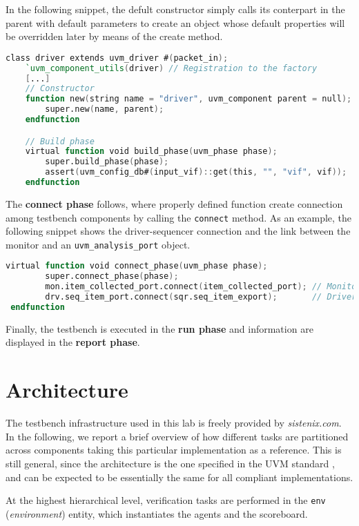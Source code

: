 In the following snippet, the defult constructor simply calls its conterpart in the parent with default parameters to create an object whose default properties will be overridden later by means of the create method.

\begin{lstlisting}[language=verilog, label=driver]
class driver extends uvm_driver #(packet_in);
	`uvm_component_utils(driver) // Registration to the factory
	[...]
	// Constructor
	function new(string name = "driver", uvm_component parent = null);
		super.new(name, parent);
	endfunction

	// Build phase
	virtual function void build_phase(uvm_phase phase);
		super.build_phase(phase);
		assert(uvm_config_db#(input_vif)::get(this, "", "vif", vif));
	endfunction
\end{lstlisting}

The \textbf{connect phase} follows, where properly defined function create connection among testbench components by calling the \texttt{connect} method. As an example, the following snippet
shows the driver-sequencer connection and the link between the monitor and an \texttt{uvm\_analysis\_port} object.

\begin{lstlisting}[language=verilog, caption=Creation phase from the agent]
 virtual function void connect_phase(uvm_phase phase);
		super.connect_phase(phase);
		mon.item_collected_port.connect(item_collected_port); // Monitor connection
		drv.seq_item_port.connect(sqr.seq_item_export);       // Driver connection with sequencer
 endfunction
	\end{lstlisting}

Finally, the testbench is executed in the \textbf{run phase} and information are displayed in  the \textbf{report phase}.
\section{Architecture}
The testbench infrastructure used in this lab is freely provided by \textit{sistenix.com}. In the following, we report a brief overview of how different tasks are partitioned across components taking this particular implementation as a reference. This is still general, since the architecture is the one specified in the UVM standard \cite{uvm_book}, and can be expected to be essentially the same for all compliant implementations.

At the highest hierarchical level, verification tasks are performed in the \texttt{env} (\textit{environment}) entity, which instantiates the agents and the scoreboard.

